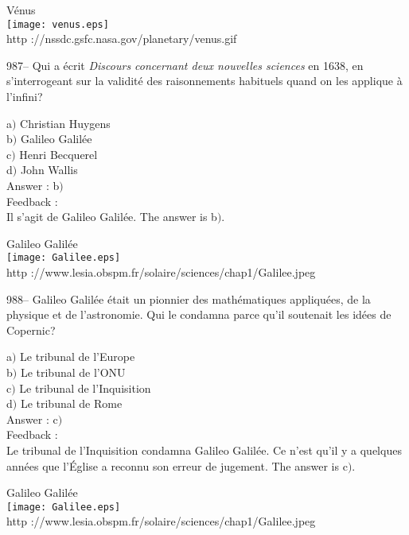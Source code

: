 ﻿\documentclass[letterpaper, 12pt]{article}
\begin{document}
        \begin{center}
        V\'enus\\
    \texttt{[image: venus.eps]}\\
        {\footnotesize http ://nssdc.gsfc.nasa.gov/planetary/venus.gif}
    \end{center}

987-- Qui a \'ecrit {\sl Discours concernant deux nouvelles
sciences} en 1638, en s'interrogeant sur la validit\'e des
raisonnements habituels quand on les applique \`a l'infini?

a$)$ Christian Huygens \\
b$)$ Galileo Galil\'ee \\
c$)$ Henri Becquerel \\
d$)$ John Wallis\\

Answer : b$)$\\

Feedback :\\
Il s'agit de Galileo Galil\'ee. The answer is b$)$.

        \begin{center}
        Galileo Galil\'ee\\
    \texttt{[image: Galilee.eps]}\\
        {\footnotesize http
://www.lesia.obspm.fr/solaire/sciences/chap1/Galilee.jpeg}
    \end{center}

988-- Galileo Galil\'ee \'etait un pionnier des math\'ematiques
appliqu\'ees, de la physique et de l'astronomie. Qui le condamna
parce qu'il soutenait les id\'ees de Copernic?

a$)$ Le tribunal de l'Europe \\
b$)$ Le tribunal de l'ONU \\
c$)$ Le tribunal de l'Inquisition \\
d$)$ Le tribunal de Rome\\

Answer : c$)$\\

Feedback : \\
Le tribunal de l'Inquisition condamna Galileo Galil\'ee. Ce n'est
qu'il y a quelques ann\'ees que l'\'Eglise a reconnu son erreur de
jugement.
The answer is c$)$.\\

        \begin{center}
        Galileo Galil\'ee\\
    \texttt{[image: Galilee.eps]}\\
        {\footnotesize http
://www.lesia.obspm.fr/solaire/sciences/chap1/Galilee.jpeg}
    \end{center}
\end{document}
